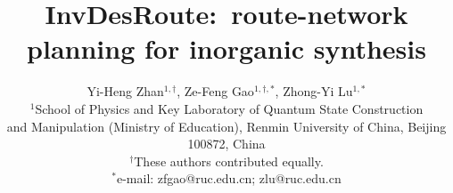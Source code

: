 \documentclass[11pt, letterpaper]{article}
\newcommand{\invdesroute}{InvDesRoute}
\begin{document}
\title{\textbf{\invdesroute{}:\ route-network planning for inorganic synthesis}}

\author{Yi-Heng Zhan$^{1,\dagger}$, Ze-Feng Gao$^{1,\dagger,*}$, Zhong-Yi Lu$^{1,*}$\\
\small $^1$School of Physics and Key Laboratory of Quantum State Construction \\
\small and Manipulation (Ministry of Education), Renmin University of China, Beijing 100872, China\\
\small $^\dagger$These authors contributed equally.\\
\small $^*$e-mail: zfgao@ruc.edu.cn; zlu@ruc.edu.cn}
\date{}
\maketitle


\date{}

\maketitle

\normalsize
\end{document}
